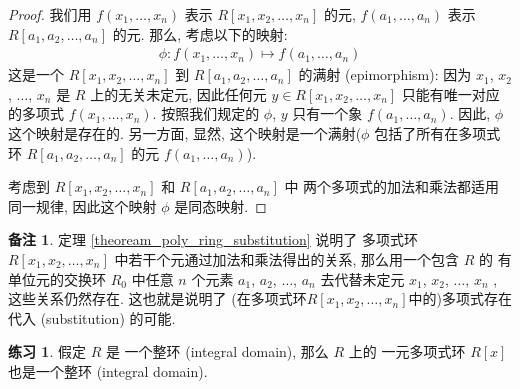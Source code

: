 \documentclass[utf8]{ctexbook}
\theoremstyle{definition}
\newtheorem{memo}{备注}[section]
\newtheorem{exercise}{练习}[section]
\begin{document}
\begin{proof}
我们用 $f(x_1, \ldots , x_n)$ 表示 $R[x_1, x_2, \ldots, x_{n} ]$ 的元, $f(a_1, \ldots , a_n)$ 表示 $R[a_1, a_2, \ldots, a_{n} ]$ 的元. 那么, 考虑以下的映射:
\begin{align*}
\phi: f(x_1, \ldots , x_n) \mapsto f(a_1, \ldots , a_n)
\end{align*}
这是一个 $R[x_1, x_2, \ldots, x_{n} ]$ 到 $R[a_1, a_2, \ldots, a_{n} ]$ 的满射 (epimorphism): 因为 $x_1$, $x_2$, $\ldots$, $x_n$ 是 $R$ 上的无关未定元, 因此任何元 $y \in R[x_1, x_2, \ldots, x_{n} ] $ 只能有唯一对应的多项式 $f(x_1, \ldots, x_n)$. 按照我们规定的 $\phi$, $y$ 只有一个象 $f(a_1, \ldots, a_n)$. 因此, $\phi$ 这个映射是存在的. 另一方面, 显然, 这个映射是一个满射($\phi$ 包括了所有在多项式环 $R[a_1, a_2, \ldots, a_{n} ]$ 的元 $f(a_1, \ldots, a_n)$).

考虑到 $R[x_1, x_2, \ldots, x_{n} ]$ 和 $R[a_1, a_2, \ldots, a_{n} ]$ 中 两个多项式的加法和乘法都适用同一规律, 因此这个映射 $\phi$ 是同态映射.

\end{proof}

\begin{memo}
定理 \ref{theoream_poly_ring_substitution} 说明了 多项式环 $R[x_1, x_2, \ldots, x_{n} ]$ 中若干个元通过加法和乘法得出的关系, 那么用一个包含 $R$ 的 有单位元的交换环 $R_0$ 中任意 $n$ 个元素 $a_1$, $a_2$, $\ldots$, $a_n$ 去代替未定元 $x_1$, $x_2$, $\ldots$, $x_n$ , 这些关系仍然存在. 这也就是说明了 (在多项式环$R[x_1, x_2, \ldots, x_{n} ]$中的)多项式存在 代入 (substitution) 的可能. 
\end{memo}

\begin{exercise}\label{exercise_R_id_to_Rx_id}
假定 $R$ 是 一个整环 (integral domain), 那么 $R$ 上的 一元多项式环 $R[x]$ 也是一个整环 (integral domain).
\end{exercise}
\end{document}
